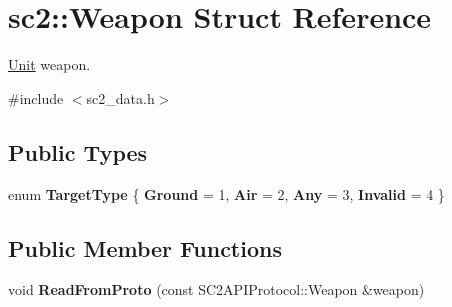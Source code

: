 \hypertarget{structsc2_1_1_weapon}{}\section{sc2\+:\+:Weapon Struct Reference}
\label{structsc2_1_1_weapon}


\hyperlink{classsc2_1_1_unit}{Unit} weapon.  




{\ttfamily \#include $<$sc2\+\_\+data.\+h$>$}

\subsection*{Public Types}
\begin{DoxyCompactItemize}
\item 
\mbox{\label{structsc2_1_1_weapon_a5ac5271d54e35bca7116578a00d86276}} 
enum {\bfseries Target\+Type} \{ {\bfseries Ground} = 1, 
{\bfseries Air} = 2, 
{\bfseries Any} = 3, 
{\bfseries Invalid} = 4
 \}
\end{DoxyCompactItemize}
\subsection*{Public Member Functions}
\begin{DoxyCompactItemize}
\item 
\mbox{\label{structsc2_1_1_weapon_a7489faf0444c6b3110d7609065242dc4}} 
void {\bfseries Read\+From\+Proto} (const S\+C2\+A\+P\+I\+Protocol\+::\+Weapon \&weapon)
\end{DoxyCompactItemize}
